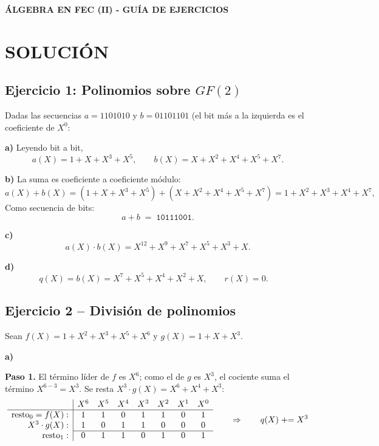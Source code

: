 \documentclass[11pt]{article}
\let\oldsection\section
\renewcommand{\section}[1]{\oldsection{\MakeUppercase{#1}}}
\begin{document}
\begin{center}
{\fontsize{16}{20}\selectfont\bfseries\color{textgray} ÁLGEBRA EN FEC (II) - GUÍA DE EJERCICIOS}
\end{center}

\vspace{4pt}

\section{Solución}

\subsection*{Ejercicio 1: Polinomios sobre $GF(2)$}

Dadas las secuencias $a=1101010$ y $b=01101101$ (el bit más a la izquierda es el coeficiente
de $X^0$:

\textbf{a)} Leyendo bit a bit,
$$a(X) = 1 + X + X^3 + X^5, \qquad b(X) = X + X^2 + X^4 + X^5 + X^7.$$

\textbf{b)} La suma es coeficiente a coeficiente módulo:
$$a(X) + b(X) = (1+X+X^3+X^5) + (X+X^2+X^4+X^5+X^7) = 1 + X^2 + X^3 + X^4 + X^7,$$
Como secuencia de bits:
$$a+b \;=\; \texttt{10111001}.$$

\textbf{c)} 
$$a(X)\cdot b(X) = X^{12} + X^9 + X^7 + X^5 + X^3 + X.$$

\textbf{d)}
$$q(X) = b(X) = X^7+X^5+X^4+X^2+X, \qquad r(X) = 0. \quad $$


\subsection*{Ejercicio 2 -- División de polinomios}
 
Sean $f(X) = 1+X^2+X^3+X^5+X^6$ y $g(X)=1+X+X^3$.
 
\textbf{a)} 
\bigskip
\renewcommand{\arraystretch}{1.3}
 
\textbf{Paso 1.} El término líder de $f$ es $X^6$; como el de $g$ es $X^3$, el cociente
suma el término $X^{6-3}=X^3$. Se resta $X^3\cdot g(X) = X^6+X^4+X^3$:
$$
\begin{array}{r|c c c c c c c}
 & X^6 & X^5 & X^4 & X^3 & X^2 & X^1 & X^0 \\
\hline
\text{resto}_0=f(X): & 1 & 1 & 0 & 1 & 1 & 0 & 1 \\
X^3\cdot g(X): & 1 & 0 & 1 & 1 & 0 & 0 & 0 \\
\cline{2-8}
\text{resto}_1: & 0 & 1 & 1 & 0 & 1 & 0 & 1 \\
\end{array}
\qquad\Rightarrow\qquad q(X)\mathrel{+}=X^3
$$
 
\end{document}
